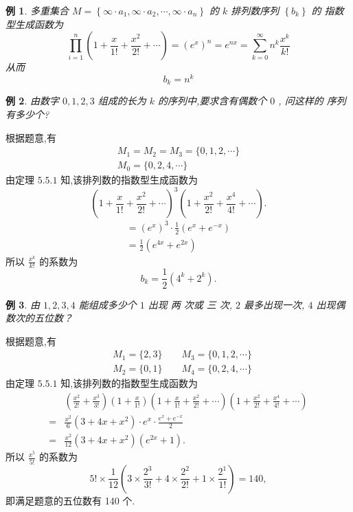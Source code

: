 \documentclass[punct]{ctexbeamer}
\newtheorem{ex}{例}[section]
\def\sol{\noindent {\bf 解\ }}
\begin{document}
\begin{frame}
	\begin{ex}
		多重集合 $M=\left\{\infty \cdot a_{1}, \infty \cdot a_{2}, \cdots, \infty \cdot a_{n}\right\}$ 的 $k$ 排列数序列 $\left\{b_{k}\right\}$ 的 指数型生成函数为
		$$
		\prod_{i=1}^{n}\left(1+\frac{x}{1 !}+\frac{x^{2}}{2 !}+\cdots\right)=\left(e^x\right)^n=e^{n x}=\sum_{k=0}^{\infty} n^{k} \frac{x^{k}}{k !}
		$$
		从而
		$$
		b_{k}=n^{k}
		$$
	\end{ex}
\end{frame}
\begin{frame}
	\begin{ex}
		由数字 $0,1,2,3$ 组成的长为 $k$ 的序列中,要求含有偶数个 $0$ , 问这样的 序列有多少个?
	\end{ex}
\pause \sol
根据题意,有
$$
\begin{array}{l}
M_{1}=M_{2}=M_{3}=\{0,1,2, \cdots\} \\
M_{0}=\{0,2,4, \cdots\}
\end{array}
$$
由定理 $5.5.1$ 知,该排列数的指数型生成函数为
$$
\left(1+\frac{x}{1 !}+\frac{x^{2}}{2 !}+\cdots\right)^{3}\left(1+\frac{x^{2}}{2 !}+\frac{x^{4}}{4 !}+\cdots\right).
$$
$$
\begin{array}{l}
=\left(e^{x}\right)^3 \cdot \frac{1}{2}  \left( e^x+e^{-x} \right)\\
=\frac{1}{2} \left(e^{4 x}+e^{2 x}\right)
\end{array}
$$
所以 $\frac{x^{k}}{k !}$ 的系数为
$$
b_{k}=\frac{1}{2}\left(4^{k}+2^{k}\right).
$$
\end{frame}

\begin{frame}
	\begin{ex}
		 由 $1,2,3,4$ 能组成多少个 $1$ 出现 两 次或 三 次,  $2$ 最多出现一次, $4$ 出现偶数次的五位数？
	\end{ex}
\pause\sol
根据题意,有
$$
\begin{aligned}
&{M}_{1}=\{2,3\} \quad\quad
{M}_{3}=\{0,1,2, \cdots\} \\
&{M}_{2}=\{0,1\} \quad\quad
{M}_{4}=\{0,2,4, \cdots\}
\end{aligned}
$$
由定理 $5.5.1$ 知,该排列数的指数型生成函数为
$$\begin{aligned}
&\left(\frac{x^{2}}{2 !}+\frac{x^{3}}{3 !}\right)\left(1+\frac{x}{1 !}\right)\left(1+\frac{x}{1 !}+\frac{x^{2}}{2 !}+\cdots\right)\left(1+\frac{x^{2}}{2 !}+\frac{x^{4}}{4 !}+\cdots\right) \\
=&\frac{x^{2}}{6}\left(3+4 x+x^{2}\right) \cdot e^x \cdot \frac{e^x+e^{-x}}{2} \\
=&\frac{x^{2}}{12}\left(3+4 x+x^{2}\right)\left(e^{2 x}+1\right).
\end{aligned}
$$
所以 $\frac{x^{5}}{5 !}$ 的系数为
$$
5 ! \times \frac{1}{12}\left(3 \times \frac{2^{3}}{3 !}+4 \times \frac{2^{2}}{2 !}+1 \times \frac{2^1}{1 !}\right)=140,
$$
即满足题意的五位数有 140 个.
\end{frame}
\end{document}
